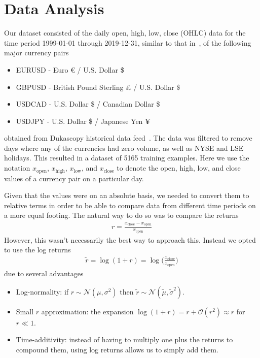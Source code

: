 \section{Data Analysis}
Our dataset consisted of the daily open, high, low, close (OHLC) data for the time period 1999-01-01 through 2019-12-31, similar to that in~\cite{kondratyev_2019}, of the following major currency pairs
\begin{itemize}
    \item EURUSD - Euro € / U.S. Dollar \$
    \item GBPUSD - British Pound Sterling £ / U.S. Dollar \$
    \item USDCAD - U.S. Dollar \$ / Canadian Dollar \$
    \item USDJPY - U.S. Dollar \$ / Japanese Yen ¥
\end{itemize}
obtained from Dukascopy historical data feed~\cite{dukascopy}.
The data was filtered to remove days where any of the currencies had zero volume, as well as NYSE and LSE holidays.
This resulted in a dataset of 5165 training examples.
Here we use the notation \( x_\text{open} \), \( x_\text{high} \), \( x_\text{low} \), and \( x_\text{close} \) to denote the open, high, low, and close values of a currency pair on a particular day.

Given that the values were on an absolute basis, we needed to convert them to relative terms in order to be able to compare data from different time periods on a more equal footing.
The natural way to do so was to compare the returns
\begin{align}
    r = \frac{x_\text{close} - x_\text{open}}{x_\text{open}}
\end{align}
However, this wasn't necessarily the best way to approach this.
Instead we opted to use the log returns
\begin{align}
    \tilde{r}
        = \log(1+r)
        = \log\bigg( \frac{x_\text{close}}{x_\text{open}} \bigg)
\end{align}
due to several advantages~\cite{quantivity_2012}
\begin{itemize}
    \item Log-normality: if \( r \sim \mathcal{N}(\mu, \sigma^2) \) then \( \tilde{r} \sim \mathcal{N}(\tilde{\mu}, \tilde{\sigma}^2) \).
    \item Small \( r \) approximation: the expansion \( \log (1 + r) = r + \mathcal{O}(r^2) \approx r \) for \( r \ll 1 \).
    \item Time-additivity: instead of having to multiply one plus the returns to compound them, using log returns allows us to simply add them.
\end{itemize}

